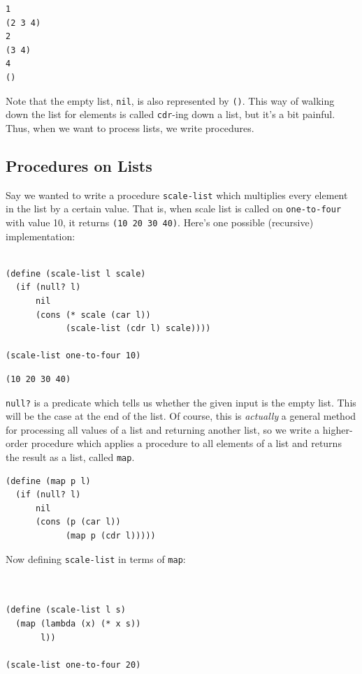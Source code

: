 \documentclass[9pt]{report}
\begin{document}
\begin{verbatim}
1
(2 3 4)
2
(3 4)
4
()
\end{verbatim}


Note that the empty list, \texttt{nil}, is also represented by \texttt{()}. This
way of walking down the list for elements is called \texttt{cdr}-ing down
a list, but it's a bit painful. Thus, when we want to process
lists, we write procedures.

\subsection{Procedures on Lists}
\label{sec:orgebffe62}

Say we wanted to write a procedure \texttt{scale-list} which multiplies
every element in the list by a certain value. That is, when scale
list is called on \texttt{one-to-four} with value 10, it returns \texttt{(10 20
    30 40)}. Here's one possible (recursive) implementation:

\begin{verbatim}

(define (scale-list l scale)
  (if (null? l)
      nil
      (cons (* scale (car l))
            (scale-list (cdr l) scale))))

(scale-list one-to-four 10)
\end{verbatim}

\begin{verbatim}
(10 20 30 40)
\end{verbatim}


\texttt{null?} is a predicate which tells us whether the given input is
the empty list. This will be the case at the end of the list.
Of course, this is \emph{actually} a general method for processing all
values of a list and returning another list, so we write a
higher-order procedure which applies a procedure to all elements
of a list and returns the result as a list, called \texttt{map}.

\begin{verbatim}
(define (map p l)
  (if (null? l)
      nil
      (cons (p (car l))
            (map p (cdr l)))))
\end{verbatim}

Now defining \texttt{scale-list} in terms of \texttt{map}:

\begin{verbatim}


(define (scale-list l s)
  (map (lambda (x) (* x s))
       l))

(scale-list one-to-four 20)
\end{verbatim}
\end{document}
